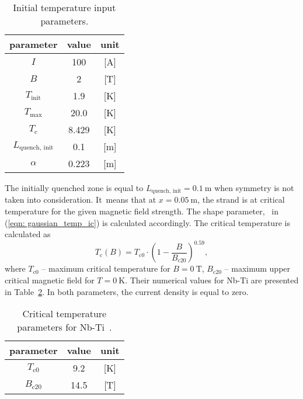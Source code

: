 \begin{table}[H]
    \caption{Initial temperature input parameters.} 
    \vspace{-1.em} 
    \fontsize{10}{10}
    \selectfont 
    \renewcommand{\arraystretch}{1.5}
    \begin{center}
        \begin{tabular}{ ccc }  
        \hline
        parameter & value & unit \\
        \hline
        $I$ & 100 & [A] \\
        $B$ & 2 & [T] \\
        $T_\text{init}$ & 1.9 & [K] \\
        $T_\text{max}$ & 20.0 & [K] \\
        $T_\text{c}$ & 8.429 & [K] \\
        $L_\text{quench, init}$ & 0.1 & [m] \\ 
        $\alpha$ & 0.223 & [m] \\   
        \hline 
        \end{tabular}
    \end{center}  
     \label{table: 1d_quench_propagation_analysis_init_temp_input_parameters} 
 \end{table}

The initially quenched zone is equal to $L_\text{quench, init}= 0.1~\text{m}$ when symmetry is not taken into consideration. It~means that at $x=0.05~\text{m}$, the strand is at critical temperature for the given magnetic field strength. The shape parameter, \textalpha~in (\ref{eqn: gaussian_temp_ic}) is calculated accordingly. The critical temperature is calculated as
\begin{equation}
    T_\text{c}(B) = T_\text{c0}\cdot(1-\frac{B}{B_\text{c20}})^{0.59},
\end{equation}
where $T_\text{c0}$ -- maximum critical temperature for $B=0~\text{T}$, $B_\text{c20}$ -- maximum upper critical magnetic field for $T=0~\text{K}$. Their numerical values for Nb-Ti are presented in Table~\ref{table: 1d_quench_propagation_analysis_crit_temp_params}. In both parameters, the current density is equal to zero. 

\begin{table}[H]
    \caption{Critical temperature parameters for Nb-Ti~\cite[p.~755]{empirical_scaling_formulas_for_critical_current}.} 
    \vspace{-1.em} 
    \fontsize{10}{10}
    \selectfont 
    \renewcommand{\arraystretch}{1.5}
    \begin{center}
        \begin{tabular}{ ccc }  
        \hline
        parameter & value & unit \\
        \hline
        $T_\text{c0}$ & 9.2 & [K] \\
        $B_\text{c20}$ & 14.5 & [T] \\
        \hline 
        \end{tabular}
    \end{center}  
     \label{table: 1d_quench_propagation_analysis_crit_temp_params} 
 \end{table}

